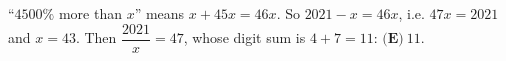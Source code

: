 ``$4500\%$ more than $x$'' means $x+45x=46x$. So $2021-x=46x$, i.e. $47x=2021$ and $x=43$. Then $\dfrac{2021}{x}=47$, whose digit sum is $4+7=11$: $\boxed{\textbf{(E)}\ 11}$.
